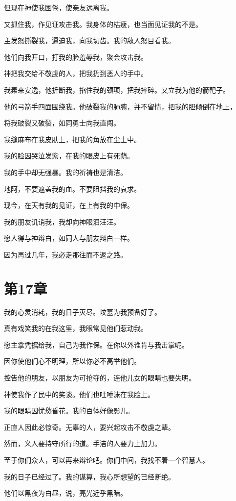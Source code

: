 \documentclass[12pt,oneside]{book}
\begin{document}
但现在神使我困倦，使亲友远离我。

又抓住我，作见证攻击我。我身体的枯瘦，也当面见证我的不是。

主发怒撕裂我，逼迫我，向我切齿。我的敌人怒目看我。

他们向我开口，打我的脸羞辱我，聚会攻击我。

神把我交给不敬虔的人，把我扔到恶人的手中。

我素来安逸，他折断我，掐住我的颈项，把我摔碎。又立我为他的箭靶子。

他的弓箭手四面围绕我。他破裂我的肺腑，并不留情，把我的胆倾倒在地上，

将我破裂又破裂，如同勇士向我直闯。

我缝麻布在我皮肤上，把我的角放在尘土中。

我的脸因哭泣发紫，在我的眼皮上有死荫。

我的手中却无强暴。我的祈祷也是清洁。

地阿，不要遮盖我的血。不要阻挡我的哀求。

现今，在天有我的见证，在上有我的中保。

我的朋友讥诮我，我却向神眼泪汪汪。

愿人得与神辩白，如同人与朋友辩白一样。

因为再过几年，我必走那往而不返之路。


\chapter{第17章}
我的心灵消耗，我的日子灭尽。坟墓为我预备好了。

真有戏笑我的在我这里，我眼常见他们惹动我。

愿主拿凭据给我，自己为我作保。在你以外谁肯与我击掌呢。

因你使他们心不明理，所以你必不高举他们。

控告他的朋友，以朋友为可抢夺的，连他儿女的眼睛也要失明。

神使我作了民中的笑谈。他们也吐唾沫在我脸上。

我的眼睛因忧愁昏花。我的百体好像影儿。

正直人因此必惊奇。无辜的人，要兴起攻击不敬虔之辈。

然而，义人要持守所行的道。手洁的人要力上加力。

至于你们众人，可以再来辩论吧。你们中间，我找不着一个智慧人。

我的日子已经过了。我的谋算，我心所想望的已经断绝。

他们以黑夜为白昼，说，亮光近乎黑暗。
\end{document}

